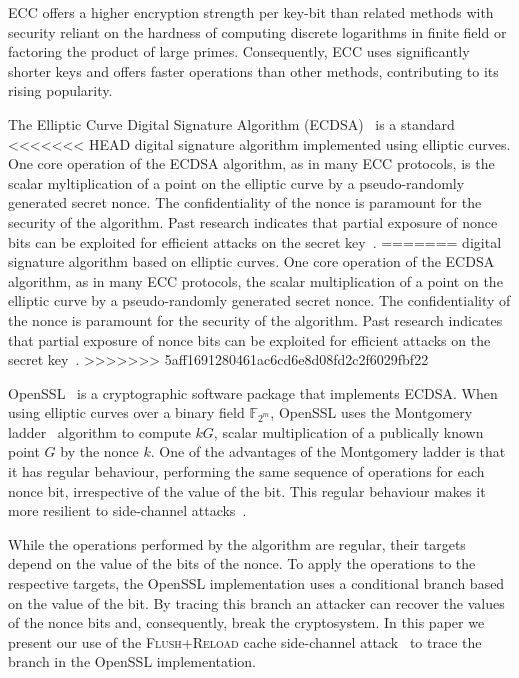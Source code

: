 \documentclass{llncs}
\begin{document}
ECC offers a higher encryption strength per key-bit than related methods with security reliant on the hardness of computing discrete logarithms in finite field or factoring the product of large primes.
Consequently, ECC uses significantly shorter keys and offers faster operations than other methods, contributing to its rising popularity.

The Elliptic Curve Digital Signature Algorithm (ECDSA)~\cite{johnson01elliptic,fips186,ansi962} is a standard
<<<<<<< HEAD
digital signature algorithm implemented using elliptic curves. One core operation of the ECDSA algorithm, as in many ECC protocols, is the scalar myltiplication of a point on the elliptic curve by a pseudo-randomly generated secret nonce. The confidentiality of the nonce is paramount for the security of the algorithm. Past research indicates that partial exposure of nonce bits can be exploited for efficient attacks on the secret key~\cite{nguyen03insecurity,brumley11remote}.
=======
digital signature algorithm based on elliptic curves. One core operation of the ECDSA algorithm, as in many ECC protocols, the scalar multiplication of a point on the elliptic curve by a pseudo-randomly generated secret nonce. The confidentiality of the nonce is paramount for the security of the algorithm. Past research indicates that partial exposure of nonce bits can be exploited for efficient attacks on the secret key~\cite{nguyen03insecurity,brumley11remote}.
>>>>>>> 5aff1691280461ac6cd6e8d08fd2c2f6029fbf22

OpenSSL~\cite{openssl} is a cryptographic software package that implements ECDSA.
When using elliptic curves over a binary field $\mathbb{F}_{2^m}$, OpenSSL uses the 
Montgomery ladder~\cite{montgomery87speeding,joye03montgomery} algorithm to compute $kG$, scalar multiplication of a publically known point $G$ by the nonce $k$.
One of the advantages of the Montgomery ladder is that it has regular behaviour, performing
the same sequence of operations for each nonce bit, irrespective of the value of the bit.
This regular behaviour makes it more resilient to side-channel attacks~\cite{joye03montgomery,okeya00elliptic}.

While the operations performed by the algorithm are regular, their targets depend on the value of the bits of the nonce.
To apply the operations to the respective targets, the OpenSSL implementation uses a conditional branch based on the value of the bit. By tracing this branch an attacker can recover the values of the nonce bits and, consequently, break the cryptosystem. In this paper we present our use of the \textsc{Flush+Reload} cache side-channel attack~\cite{yarom13flush} to trace the branch in the OpenSSL implementation.
\end{document}
